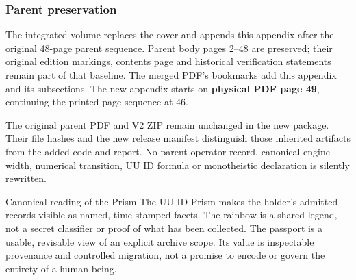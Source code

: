 \documentclass[11pt,a4paper]{article}
\begin{document}
\subsubsection{Parent preservation}
The integrated volume replaces the cover and appends this appendix after the original 48-page parent sequence. Parent body pages 2--48 are preserved; their original edition markings, contents page and historical verification statements remain part of that baseline. The merged PDF's bookmarks add this appendix and its subsections. The new appendix starts on \textbf{physical PDF page 49}, continuing the printed page sequence at 46.

The original parent PDF and V2 ZIP remain unchanged in the new package. Their file hashes and the new release manifest distinguish those inherited artifacts from the added code and report. No parent operator record, canonical engine width, numerical transition, UU ID formula or monotheistic declaration is silently rewritten.

\begin{formal}{Canonical reading of the Prism}
The UU ID Prism makes the holder's admitted records visible as named, time-stamped facets. The rainbow is a shared legend, not a secret classifier or proof of what has been collected. The passport is a usable, revisable view of an explicit archive scope. Its value is inspectable provenance and controlled migration, not a promise to encode or govern the entirety of a human being.
\end{formal}
\end{document}
